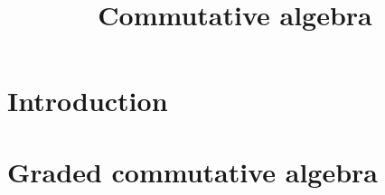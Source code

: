 
\title{Commutative algebra}

\maketitle
\tableofcontents



\section{Introduction}\label{sec-introduction}

\section{Graded commutative algebra}



\cite{stacks-project}

\printbibliography
